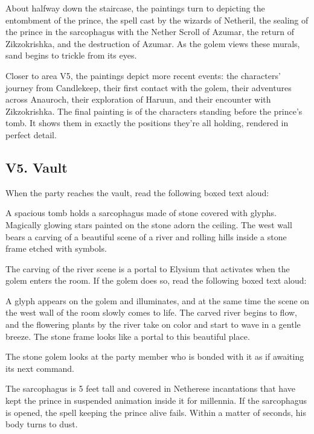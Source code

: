 \documentclass[10pt,a4paper,twoside,bg=print,twocolumn,openany,nodeprecatedcode]{dndbook}
\begin{document}
About halfway down the staircase, the paintings turn to depicting the entombment of the prince, the spell cast by the wizards of Netheril, the sealing of the prince in the sarcophagus with the Nether Scroll of Azumar, the return of Zikzokrishka, and the destruction of Azumar. As the golem views these murals, sand begins to trickle from its eyes.

Closer to area V5, the paintings depict more recent events: the characters' journey from Candlekeep, their first contact with the golem, their adventures across Anauroch, their exploration of Haruun, and their encounter with Zikzokrishka. The final painting is of the characters standing before the prince's tomb. It shows them in exactly the positions they're all holding, rendered in perfect detail.

\subsection{V5. Vault}
When the party reaches the vault, read the following boxed text aloud:

\begin{DndReadAloud}{}
A spacious tomb holds a sarcophagus made of stone covered with glyphs. Magically glowing stars painted on the stone adorn the ceiling. The west wall bears a carving of a beautiful scene of a river and rolling hills inside a stone frame etched with symbols.

\end{DndReadAloud}

The carving of the river scene is a portal to Elysium that activates when the golem enters the room. If the golem does so, read the following boxed text aloud:

\begin{DndReadAloud}{}
A glyph appears on the golem and illuminates, and at the same time the scene on the west wall of the room slowly comes to life. The carved river begins to flow, and the flowering plants by the river take on color and start to wave in a gentle breeze. The stone frame looks like a portal to this beautiful place.

\end{DndReadAloud}

The stone golem looks at the party member who is bonded with it as if awaiting its next command.

The sarcophagus is 5 feet tall and covered in Netherese incantations that have kept the prince in suspended animation inside it for millennia. If the sarcophagus is opened, the spell keeping the prince alive fails. Within a matter of seconds, his body turns to dust.
\end{document}
